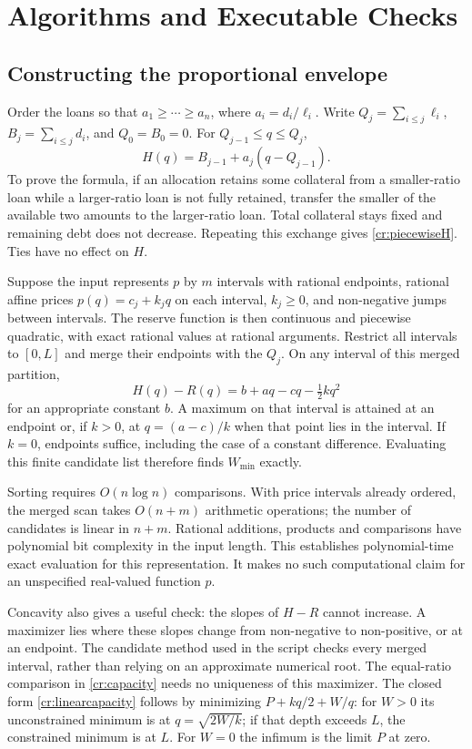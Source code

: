 \section{Algorithms and Executable Checks}\label{sec:algo}

\subsection{Constructing the proportional envelope}\label{cr:algorithm}

Order the loans so that $a_1\ge\cdots\ge a_n$, where $a_i=d_i/\ell_i$. Write $Q_j=\sum_{i\le j}\ell_i$, $B_j=\sum_{i\le j}d_i$, and $Q_0=B_0=0$. For $Q_{j-1}\le q\le Q_j$,
\begin{equation}\label{cr:piecewiseH}
H(q)=B_{j-1}+a_j(q-Q_{j-1}).
\end{equation}
To prove the formula, if an allocation retains some collateral from a smaller-ratio loan while a larger-ratio loan is not fully retained, transfer the smaller of the available two amounts to the larger-ratio loan. Total collateral stays fixed and remaining debt does not decrease. Repeating this exchange gives \eqref{cr:piecewiseH}. Ties have no effect on $H$.

Suppose the input represents $p$ by $m$ intervals with rational endpoints, rational affine prices $p(q)=c_j+k_jq$ on each interval, $k_j\ge0$, and non-negative jumps between intervals. The reserve function is then continuous and piecewise quadratic, with exact rational values at rational arguments. Restrict all intervals to $[0,L]$ and merge their endpoints with the $Q_j$. On any interval of this merged partition,
\[
H(q)-R(q)=b+aq-cq-\tfrac12 kq^2
\]
for an appropriate constant $b$. A maximum on that interval is attained at an endpoint or, if $k>0$, at $q=(a-c)/k$ when that point lies in the interval. If $k=0$, endpoints suffice, including the case of a constant difference. Evaluating this finite candidate list therefore finds $W_{\min}$ exactly.

Sorting requires $O(n\log n)$ comparisons. With price intervals already ordered, the merged scan takes $O(n+m)$ arithmetic operations; the number of candidates is linear in $n+m$. Rational additions, products and comparisons have polynomial bit complexity in the input length. This establishes polynomial-time exact evaluation for this representation. It makes no such computational claim for an unspecified real-valued function $p$.

Concavity also gives a useful check: the slopes of $H-R$ cannot increase. A maximizer lies where these slopes change from non-negative to non-positive, or at an endpoint. The candidate method used in the script checks every merged interval, rather than relying on an approximate numerical root. The equal-ratio comparison in \cref{cr:capacity} needs no uniqueness of this maximizer. The closed form \eqref{cr:linearcapacity} follows by minimizing $P+kq/2+W/q$: for $W>0$ its unconstrained minimum is at $q=\sqrt{2W/k}$; if that depth exceeds $L$, the constrained minimum is at $L$. For $W=0$ the infimum is the limit $P$ at zero.

